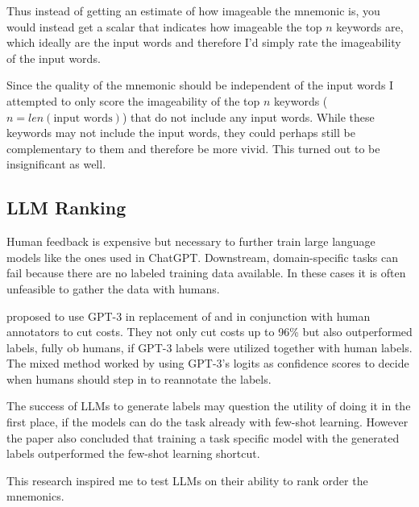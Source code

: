 Thus instead of getting an estimate of how imageable the mnemonic is, you would instead get a scalar that indicates how imageable the top $n$ keywords are, which ideally are the input words and therefore I'd simply rate the imageability of the input words.

Since the quality of the mnemonic should be independent of the input words I attempted to only score the imageability of the top $n$ keywords ($n = len(\text{input words})$) that do not include any input words. While these keywords may not include the input words, they could perhaps still be complementary to them and therefore be more vivid. This turned out to be insignificant as well.
\subsection{LLM Ranking}
Human feedback is expensive but necessary to further train large language models like the ones used in ChatGPT. Downstream, domain-specific tasks can fail because there are no labeled training data available. In these cases it is often unfeasible to gather the data with humans.

\cite{wang2021want} proposed to use GPT-3 in replacement of and in conjunction with human annotators to cut costs. They not only cut costs up to 96\% but also outperformed labels, fully ob humans, if GPT-3 labels were utilized together with human labels. The mixed method worked by using GPT-3's logits as confidence scores to decide when humans should step in to reannotate the labels. 

The success of LLMs to generate labels may question the utility of doing it in the first place, if the models can do the task already with few-shot learning. However the paper also concluded that training a task specific model with the generated labels outperformed the few-shot learning shortcut.

This research inspired me to test LLMs on their ability to rank order the mnemonics.

